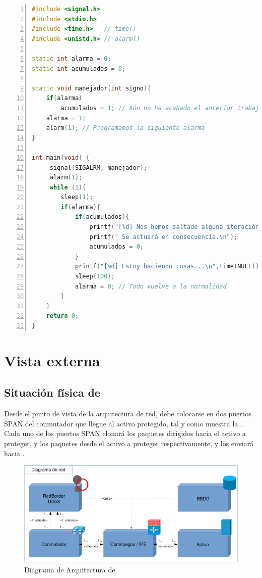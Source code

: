 \begin{lstlisting}[language=C++,caption={Ejemplo de uso de \gls{SIGALRM} con detección de pérdidas}, breaklines=true, 
label=code:AlarmSignalAcumulados,numbers=left,float=htbp]
#include <signal.h>
#include <stdio.h>
#include <time.h>   // time()
#include <unistd.h> // alarm()

static int alarma = 0;
static int acumulados = 0;

static void manejador(int signo){
    if(alarma)
        acumulados = 1; // Aún no ha acabado el anterior trabajo
    alarma = 1;
    alarm(1); // Programamos la siguiente alarma
}

int main(void) {
     signal(SIGALRM, manejador);
     alarm(1);
     while (1){
        sleep(1);
        if(alarma){
            if(acumulados){
                printf("[%d] Nos hemos saltado alguna iteración.",time(NULL));
                printf(" Se actuará en consecuencia.\n");
                acumulados = 0;
            }
            printf("[%d] Estoy haciendo cosas...\n",time(NULL));
            sleep(100);
            alarma = 0; // Todo vuelve a la normalidad
        }
    }
    return 0;
}
\end{lstlisting}

\section{Vista externa}
\subsection{Situación física de \redborderddos}
Desde el punto de vista de la arquitectura de red, \redborderddos{} debe colocarse en dos puertos SPAN del conmutador que llegue al activo protegido, tal y como muestra la . Cada uno de los 
puertos SPAN clonará los paquetes dirigidos hacia el activo a proteger, y los paquetes desde el activo a proteger 
respectivamente, y los enviará hacia \redborderddos.

\begin{figure}[htbp]
\centering
\includegraphics[width=\textwidth]{CapituloEstructura/Figuras/DiagramaArquitectura-crop}
\caption{Diagrama de Arquitectura de \redborderddos}
\end{figure}
%

